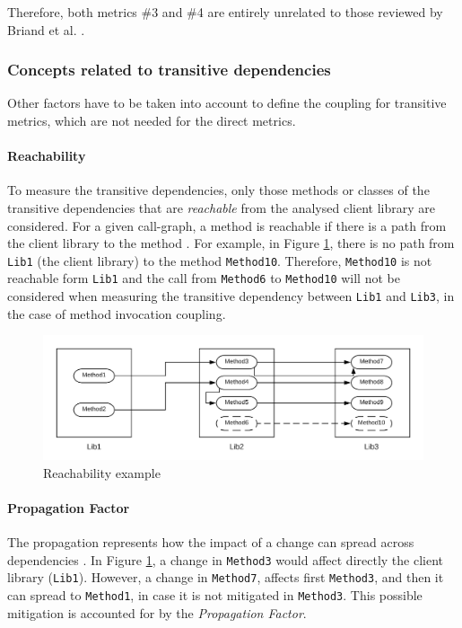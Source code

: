 Therefore, both metrics \#3 and \#4 are entirely unrelated to those reviewed by Briand et al. \cite{briand1999unified}.

\subsubsection{Concepts related to transitive dependencies}
Other factors have to be taken into account to define the coupling for transitive metrics, which are not needed for the direct metrics.

\paragraph{Reachability}
To measure the transitive dependencies, only those methods or classes of the transitive dependencies that are \textit{reachable} from the analysed client library are considered. For a given call-graph, a method is reachable if there is a path from the client library to the method \cite{fasten2020D3.2}. For example, in Figure \ref{fig:reachability}, there is no path from \texttt{Lib1} (the client library) to the method \texttt{Method10}. Therefore, \texttt{Method10} is not reachable form \texttt{Lib1} and the call from \texttt{Method6} to \texttt{Method10} will not be considered when measuring the transitive dependency between \texttt{Lib1} and \texttt{Lib3}, in the case of method invocation coupling.

\begin{figure}[ht]
\begin{center}
\includegraphics[width=\textwidth]{figures/Reachability.png}
\caption{Reachability example}
\label{fig:reachability}
\end{center}
\end{figure}

\paragraph{Propagation Factor}
The propagation represents how the impact of a change can spread across dependencies \cite{fasten2019survey}. In Figure \ref{fig:reachability}, a change in \texttt{Method3} would affect directly the client  library (\texttt{Lib1}). However, a change in \texttt{Method7}, affects first \texttt{Method3}, and then it can spread to \texttt{Method1}, in case it is not mitigated in \texttt{Method3}. This possible mitigation is accounted for by the \textit{Propagation Factor}.

